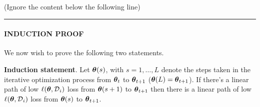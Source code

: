 \documentclass{article} %
\newcommand{\lighthline}{\noindent\textcolor{gray!50}{\rule{\linewidth}{0.4pt}}}
\begin{document}
\vspace{1cm}

(Ignore the content below the following line)

\lighthline


\paragraph{INDUCTION PROOF} We now wish to prove the following two statements.

\textbf{Induction statement}. Let $\vparam(s)$, with $s=1,\dots,L$ denote the steps taken in the iterative optimization process from $\vparam_{t}$ to $\vparam_{t+1}$ ($\vparam(L) = \vparam_{t+1}$). If there's a linear path of low $\loss(\vparam,\data_i)$ loss from $\vparam(s+1)$ to $\vparam_{t+1}$ then there is a linear path of low $\loss(\vparam,\data_i)$ loss from $\vparam(s)$ to $\vparam_{t+1}$. 
\end{document}

